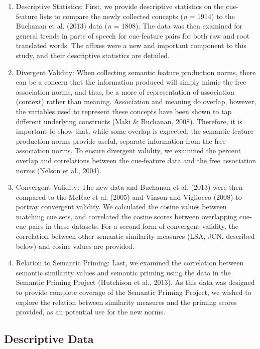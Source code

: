 \documentclass[english,,man]{apa6}
\providecommand{\tightlist}{%
  \setlength{\itemsep}{0pt}\setlength{\parskip}{0pt}}
\begin{document}
\begin{enumerate}
\def\labelenumi{\arabic{enumi})}
\tightlist
\item
  Descriptive Statistics: First, we provide descriptive statistics on the cue-feature lists to compare the newly collected concepts (\emph{n} = 1914) to the Buchanan et al. (2013) data (\emph{n} = 1808). The data was then examined for general trends in parts of speech for cue-feature pairs for both raw and root translated words. The affixes were a new and important component to this study, and their descriptive statistics are detailed.
\item
  Divergent Validity: When collecting semantic feature production norms, there can be a concern that the information produced will simply mimic the free association norms, and thus, be a more of representation of association (context) rather than meaning. Association and meaning do overlap, however, the variables used to represent these concepts have been shown to tap different underlying constructs (Maki \& Buchanan, 2008). Therefore, it is important to show that, while some overlap is expected, the semantic feature production norms provide useful, separate information from the free association norms. To ensure divergent validity, we examined the percent overlap and correlations between the cue-feature data and the free association norms (Nelson et al., 2004).
\item
  Convergent Validity: The new data and Buchanan et al. (2013) were then compared to the McRae et al. (2005) and Vinson and Vigliocco (2008) to portray convergent validity. We calculated the cosine values between matching cue sets, and correlated the cosine scores between overlapping cue-cue pairs in these datasets. For a second form of convergent validity, the correlation between other semantic similarity measures (LSA, JCN, described below) and cosine values are provided.\\
\item
  Relation to Semantic Priming: Last, we examined the correlation between semantic similarity values and semantic priming using the data in the Semantic Priming Project (Hutchison et al., 2013). As this data was designed to provide complete coverage of the Semantic Priming Project, we wished to explore the relation between similarity measures and the priming scores provided, as an potential use for the new norms.
\end{enumerate}

\hypertarget{descriptive-data}{%
\subsection{Descriptive Data}\label{descriptive-data}}
\end{document}
